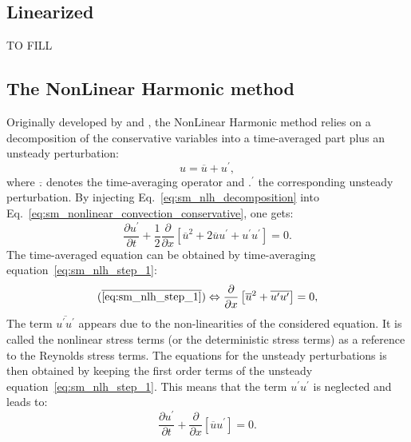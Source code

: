 \subsection{Linearized} %
\label{sub:sm_linearized_method}

TO FILL


\subsection{The NonLinear Harmonic method} %
\label{sub:sm_nonlinear_harmonic_method}

Originally developed by \citet{He1998} and \citet{Ning1998},
the 
NonLinear Harmonic method
relies on a decomposition of the conservative variables into a
time-averaged part plus an unsteady perturbation:
\begin{equation}
	u = \overline{u} + u^\prime,
	\label{eq:sm_nlh_decomposition}
\end{equation}
where $\overline{.}$ denotes the time-averaging operator and
$.^\prime$ the corresponding unsteady perturbation.
By injecting Eq.~\ref{eq:sm_nlh_decomposition} into
Eq.~\ref{eq:sm_nonlinear_convection_conservative}, one gets:
\begin{equation}
	\frac{\partial u^\prime}{\partial t} + 
	\frac{1}{2}\frac{\partial}{\partial x} \left[
	\overline{u}^2 + 2 \overline{u} u^\prime + u^\prime u^\prime \right] = 
	0.
	\label{eq:sm_nlh_step_1}
\end{equation}
The time-averaged equation can be obtained by time-averaging
equation~\ref{eq:sm_nlh_step_1}:
\begin{equation}
	(\overline{\ref{eq:sm_nlh_step_1}})
	\Leftrightarrow
	\frac{\partial}{\partial x}
	\left[\overline{u}^2 + 
	\overline{u^\prime u^\prime}\right] =
	0,
	\label{eq:sm_nlh_step_2}
\end{equation}
The term $\overline{u^\prime u^\prime}$
appears due to the non-linearities of the considered equation. It
is called the nonlinear stress terms 
(or the deterministic stress terms) as a reference to 
the Reynolds stress terms. 
The equations for the unsteady perturbations is then obtained by keeping
the first order terms of the unsteady equation~\ref{eq:sm_nlh_step_1}.
This means that the term $u^\prime u^\prime$ is neglected and leads
to:
\begin{equation}
	\frac{\partial u^\prime}{\partial t} + 
	\frac{\partial}{\partial x} \left[\overline{u} u^\prime \right] = 
	0.
\end{equation}

